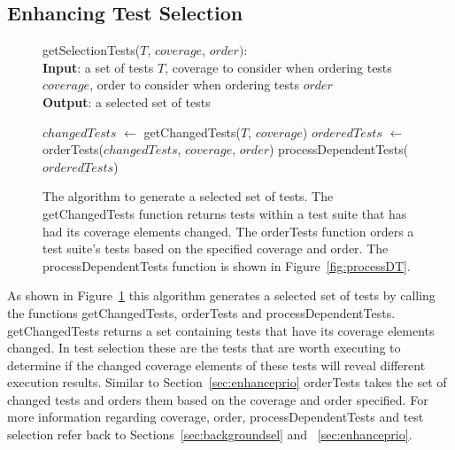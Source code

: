 \subsection{Enhancing Test Selection}
\label{sec:enhancesel}
\begin{figure}[t]
	getSelectionTests($\mathit{T}$, $\mathit{coverage}$, $\mathit{order}):$\\
	\textbf{Input}: a set of tests $\mathit{T}$, coverage to consider when ordering
	tests $\mathit{coverage}$, order to consider when ordering tests $\mathit{order}$\\
	\textbf{Output}: a selected set of tests\\
	 \begin{algorithmic}[1]
	 	\vspace{-5mm}
	 	\STATE $\mathit{changedTests}$ $\leftarrow$ getChangedTests($\mathit{T}$,
	 	$\mathit{coverage}$)
		\STATE $\mathit{orderedTests}$ $\leftarrow$ orderTests($\mathit{changedTests}$,
		$\mathit{coverage}$, $\mathit{order}$)
		\RETURN processDependentTests($\mathit{orderedTests}$)
	\end{algorithmic}
	\vspace{-3mm}
	\caption {
		The algorithm to generate a selected set of tests. The
		getChangedTests function returns tests within a test suite that has had its
		coverage elements changed. The orderTests function orders a test suite's tests
		based on the specified coverage and order. The processDependentTests function
		is shown in Figure~\ref{fig:processDT}. 
	}
	\label{fig:selection}
\end{figure}
As shown in Figure~\ref{fig:selection} this algorithm generates a selected
set of tests by calling the functions getChangedTests, orderTests and
processDependentTests. getChangedTests returns a set containing tests
that have its coverage elements changed. In test selection these are the tests
that are worth executing to determine if the changed coverage elements of these
tests will reveal different execution results. Similar to Section~\ref{sec:enhanceprio}
orderTests takes the set of changed tests and orders them based on the coverage
and order specified. For more information regarding coverage, order,
processDependentTests and test selection refer back to Sections~\ref{sec:backgroundsel}
and ~\ref{sec:enhanceprio}.

